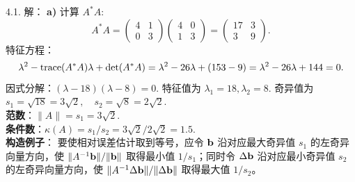 \begin{exer}
\vspace{5ex}

4.1. 解：
\textbf{a)} 计算 $A^*A$:
$$ A^*A = \begin{pmatrix} 4 & 1 \\ 0 & 3 \end{pmatrix} \begin{pmatrix} 4 & 0 \\ 1 & 3 \end{pmatrix} = \begin{pmatrix} 17 & 3 \\ 3 & 9 \end{pmatrix}. $$
特征方程：
$$ \lambda^2 - \operatorname{trace}(A^*A)\lambda + \det(A^*A) = \lambda^2 - 26\lambda + (153-9) = \lambda^2 - 26\lambda + 144 = 0. $$
因式分解：$(\lambda - 18)(\lambda - 8) = 0$.
特征值为 $\lambda_1 = 18, \lambda_2 = 8$.
奇异值为 $s_1 = \sqrt{18} = 3\sqrt{2}, \quad s_2 = \sqrt{8} = 2\sqrt{2}$.\\
\textbf{范数}：$\|A\| = s_1 = 3\sqrt{2}$.\\
\textbf{条件数}：$\kappa(A) = s_1 / s_2 = 3\sqrt{2} / 2\sqrt{2} = 1.5$.
\\
\textbf{构造例子}：
要使相对误差估计取到等号，应令 $\mathbf{b}$ 沿对应最大奇异值 $s_1$ 的左奇异向量方向，使 $\|A^{-1}\mathbf{b}\|/\|\mathbf{b}\|$ 取得最小值 $1/s_1$；同时令 $\Delta\mathbf{b}$ 沿对应最小奇异值 $s_2$ 的左奇异向量方向，使 $\|A^{-1}\Delta\mathbf{b}\|/\|\Delta\mathbf{b}\|$ 取得最大值 $1/s_2$。


\end{exer}
